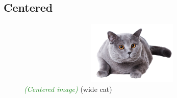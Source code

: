 \documentclass{article}
\newcommand{\ccheck}[1]{\textcolor{ForestGreen}{\emph{(\checkmark #1)}}} %
\begin{document}
\subsection{Centered}
\begin{figure}[h]
    \centering
    \includegraphics[width=12cm, height=3cm]{catpng}
    \captionsetup{justification=centering}
    \caption{\ccheck{Centered image} (wide cat)} %
    \label{fig: centercat}
\end{figure}
\end{document}
